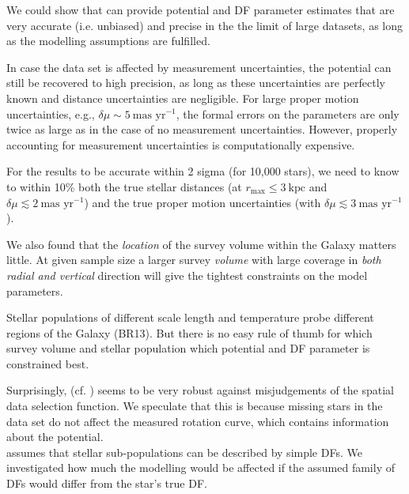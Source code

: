  We could show that \RM{} can provide potential and DF parameter estimates that are very accurate (i.e. unbiased) and precise in the the limit of large datasets, as long as the modelling assumptions are fulfilled.

In case the data set is affected by measurement uncertainties, the potential can still be recovered to high precision, as long as these uncertainties are perfectly known and distance uncertainties are negligible. For large proper motion uncertainties, e.g., $\delta \mu \sim 5~\text{mas yr}^{-1}$, the formal errors on the parameters are only twice as large as in the case of no measurement uncertainties. However, properly accounting for measurement uncertainties is computationally expensive.

For the results to be accurate within 2 sigma (for 10,000 stars), we need to know to within 10\% both the true stellar distances (at $r_\text{max} \leq 3~\text{kpc}$ and $\delta \mu \lesssim 2 ~ \text{mas yr}^{-1}$) and the true proper motion uncertainties (with $\delta \mu \lesssim 3 ~ \text{mas yr}^{-1}$).

We also found that the \emph{location} of the survey volume within the Galaxy matters little. At given sample size a larger survey \emph{volume} with large coverage in \emph{both radial and vertical} direction will give the tightest constraints on the model parameters.

Stellar populations of different scale length and temperature probe different regions of the Galaxy (BR13). But there is no easy rule of thumb for which survey volume and stellar population which potential and DF parameter is constrained best.

Surprisingly, (cf. \citealt{2013A&ARv..21...61R}) \RM{} seems to be very robust against misjudgements of the spatial data selection function. We speculate that this is because missing stars in the data set do not affect the measured rotation curve, which contains information about the potential.\\


 \RM{} assumes that stellar sub-populations can be described by simple DFs. We investigated how much the modelling would be affected if the assumed family of DFs would differ from the star's true DF.

